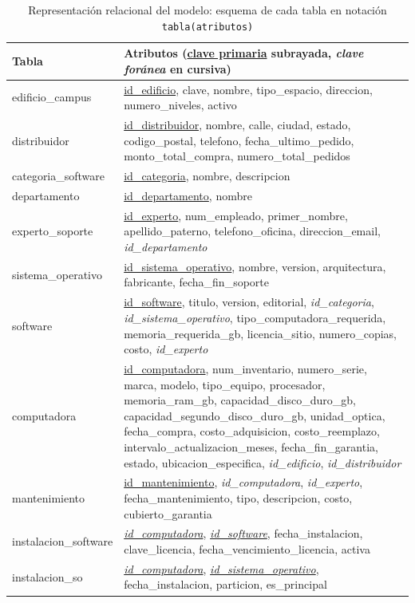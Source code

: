 \documentclass[10pt,a4paper]{article}
\begin{document}
\begin{table}[H]
	\centering
	\small
	\renewcommand{\arraystretch}{1.3}
	\begin{tabular}{p{4.3cm} | p{10.3cm}}
		\hline\hline
		\textbf{Tabla} & \textbf{Atributos (\underline{clave primaria} subrayada, \textit{clave foránea} en cursiva)} \\ \hline\hline
		\ttfamily edificio\_campus & \ttfamily\underline{id\_edificio}, clave, nombre, tipo\_espacio, direccion, numero\_niveles, activo \\ \hline
		\ttfamily distribuidor & \ttfamily\underline{id\_distribuidor}, nombre, calle, ciudad, estado, codigo\_postal, telefono, fecha\_ultimo\_pedido, monto\_total\_compra, numero\_total\_pedidos \\ \hline
		\ttfamily categoria\_software & \ttfamily\underline{id\_categoria}, nombre, descripcion \\ \hline
		\ttfamily departamento & \ttfamily\underline{id\_departamento}, nombre \\ \hline
		\ttfamily experto\_soporte & \ttfamily\underline{id\_experto}, num\_empleado, primer\_nombre, apellido\_paterno, telefono\_oficina, direccion\_email, \textit{id\_departamento} \\ \hline
		\ttfamily sistema\_operativo & \ttfamily\underline{id\_sistema\_operativo}, nombre, version, arquitectura, fabricante, fecha\_fin\_soporte \\ \hline
		\ttfamily software & \ttfamily\underline{id\_software}, titulo, version, editorial, \textit{id\_categoria}, \textit{id\_sistema\_operativo}, tipo\_computadora\_requerida, memoria\_requerida\_gb, licencia\_sitio, numero\_copias, costo, \textit{id\_experto} \\ \hline
		\ttfamily computadora & \ttfamily\underline{id\_computadora}, num\_inventario, numero\_serie, marca, modelo, tipo\_equipo, procesador, memoria\_ram\_gb, capacidad\_disco\_duro\_gb, capacidad\_segundo\_disco\_duro\_gb, unidad\_optica, fecha\_compra, costo\_adquisicion, costo\_reemplazo, intervalo\_actualizacion\_meses, fecha\_fin\_garantia, estado, ubicacion\_especifica, \textit{id\_edificio}, \textit{id\_distribuidor} \\ \hline
		\ttfamily mantenimiento & \ttfamily\underline{id\_mantenimiento}, \textit{id\_computadora}, \textit{id\_experto}, fecha\_mantenimiento, tipo, descripcion, costo, cubierto\_garantia \\ \hline
		\ttfamily instalacion\_software & \ttfamily\underline{\textit{id\_computadora}}, \underline{\textit{id\_software}}, fecha\_instalacion, clave\_licencia, fecha\_vencimiento\_licencia, activa \\ \hline
		\ttfamily instalacion\_so & \ttfamily\underline{\textit{id\_computadora}}, \underline{\textit{id\_sistema\_operativo}}, fecha\_instalacion, particion, es\_principal \\ \hline\hline
	\end{tabular}
	\renewcommand{\arraystretch}{1}
	\caption{Representación relacional del modelo: esquema de cada tabla en notación \texttt{tabla(atributos)}}
	\label{tabla:relacional}
\end{table}
\end{document}
